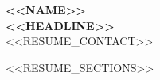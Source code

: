 \documentclass[letterpaper,11pt]{article}
\begin{document}
\begin{center}
  \textbf{\Huge \scshape <<NAME>>} \\ \vspace{4pt}
  \textbf{\normalsize <<HEADLINE>>} \\ \vspace{3pt}
  \small <<RESUME_CONTACT>>
\end{center}

<<RESUME_SECTIONS>>
\end{document}
